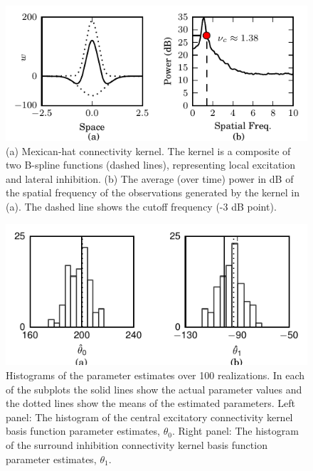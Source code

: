 \documentclass[journal,a4paper]{IEEEtran}
\begin{document}
\begin{figure}[!h]
 \centering
 \includegraphics[scale=1]{./Graph/ObservationFreqResponse.pdf}
 \caption{(a) Mexican-hat connectivity kernel. The kernel is a composite of two B-spline
functions (dashed lines), representing local excitation and lateral inhibition. (b) The average (over time) power in dB of the spatial frequency of the observations generated by the kernel in (a). The dashed line shows the cutoff frequency (-3 dB point).}
\label{fig:KernelAndFreqResponse} 
  \end{figure} 
\begin{figure}[!h] 
 \centering
 \includegraphics[scale=1]{./Graph/Hist.pdf}
 \caption{Histograms of the parameter estimates over 100 realizations. In each of the subplots
the solid lines show the actual parameter values and the dotted lines show the means of the estimated
parameters. Left panel: The histogram of the central excitatory connectivity kernel basis function parameter
estimates, $\theta_0$. Right panel: The histogram of the surround inhibition connectivity kernel basis function parameter
estimates, $\theta_1$.}
 \label{fig:ParametersHistogram}
 \end{figure} 
\end{document}
